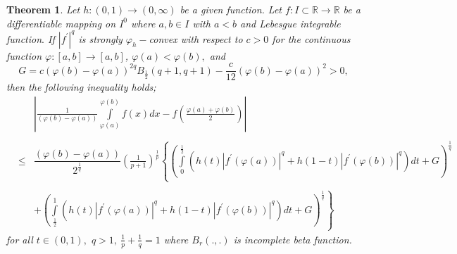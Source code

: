 \documentclass{amsart}
\newtheorem{theorem}{Theorem}
\theoremstyle{plain}
\numberwithin{equation}{section}
\begin{document}
\begin{theorem}
\label{t4} Let $h:\left( 0,1\right) \rightarrow \left( 0,\infty \right) $ be
a given function. Let $f:I\subset 
\mathbb{R}
\rightarrow 
\mathbb{R}
$ be a differentiable mapping on $I^{0}$ where $a,b\in I$ with $a<b$ and
Lebesgue integrable function$.$ If $\left\vert f^{\prime }\right\vert ^{q}$
is strongly $\varphi _{h}-$convex with respect to $c>0$ for the continuous
function $\varphi :\left[ a,b\right] \rightarrow \left[ a,b\right] $, $\varphi (a)<\varphi (b),$ and\begin{equation*}
G=c(\varphi (b)-\varphi (a))^{2q}B_{\frac{1}{2}}(q+1,q+1)-\frac{c}{12}(\varphi (b)-\varphi (a))^{2}>0,
\end{equation*}then the following inequality holds;\begin{eqnarray*}
&&\left\vert \frac{1}{(\varphi (b)-\varphi (a))}\int\limits_{\varphi
(a)}^{\varphi (b)}f\left( x\right) dx-f\left( \frac{\varphi (a)+\varphi (b)}{2}\right) \right\vert  \\
&& \\
&\leq &\dfrac{(\varphi (b)-\varphi (a))}{2^{\frac{1}{q}}}\left( \frac{1}{p+1}\right) ^{\frac{1}{p}}\left\{ \left( \int\limits_{0}^{\frac{1}{2}}\left(
h(t)\left\vert f^{\prime }(\varphi (a))\right\vert ^{q}+h(1-t)\left\vert
f^{\prime }(\varphi (b))\right\vert ^{q}\right) dt+G\right) ^{\frac{1}{q}}\right.  \\
&& \\
&&+\left. \left( \int\limits_{\frac{1}{2}}^{1}\left( h(t)\left\vert
f^{\prime }(\varphi (a))\right\vert ^{q}+h(1-t)\left\vert f^{\prime
}(\varphi (b))\right\vert ^{q}\right) dt+G\right) ^{\frac{1}{q}}\right\} 
\end{eqnarray*}for all $t\in \left( 0,1\right) ,$ $q>1,\ \frac{1}{p}+\frac{1}{q}=1$ where $B_{r}(.,.)$ is incomplete beta function.
\end{theorem}
\end{document}
